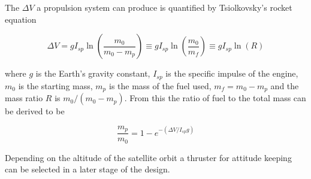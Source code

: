 The $\Delta V$ a propulsion system can produce is quantified by Tsiolkovsky's rocket equation

\begin{equation}
\Delta V = g I_{sp} \ln{\left(\frac{m_0}{m_0-m_p}\right)}\equiv g I_{sp} \ln{\left(\frac{m_0}{m_f}\right)} \equiv g I_{sp} \ln{\left(R\right)}
\label{eqn:tsiolkovsky}
\end{equation}

where $g$ is the Earth's gravity constant, $I_{sp}$ is the specific impulse of the engine, $m_0$ is the starting mass, $m_p$ is the mass of the fuel used, $m_f = m_0-m_p$ and the mass ratio $R$ is  ${m_0}/\left({m_0-m_p}\right)$. From this the ratio of fuel to the total mass can be derived to be

\begin{equation}
\frac{m_p}{m_0} = 1-e^{-\left(\Delta V/I_{sp}g\right)}
\label{eqn:fuelratio}
\end{equation}

Depending on the altitude of the satellite orbit a thruster for attitude keeping can be selected in a later stage of the design.